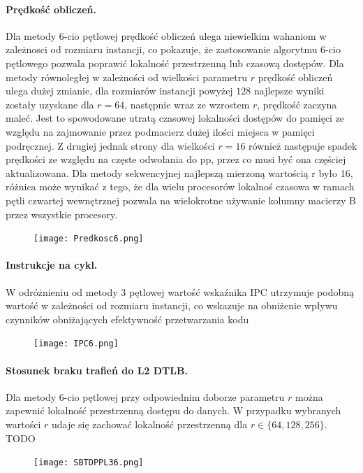 \documentclass{scrartcl}
\begin{document}
\paragraph{Prędkość obliczeń.} Dla metody 6-cio pętlowej prędkość obliczeń ulega niewielkim wahaniom w zależnosci od rozmiaru instancji, co pokazuje, że zastosowanie algorytmu 6-cio pętlowego pozwala poprawić lokalność przestrzenną lub czasową dostępów. Dla metody równoległej w zależności od wielkości parametru $r$ prędkość obliczeń ulega dużej zmianie, dla rozmiarów instancji powyżej $128$ najlepsze wyniki zostały uzyskane dla $r = 64$, następnie wraz ze wzrostem $r$, prędkość zaczyna maleć. Jest to spowodowane utratą czasowej lokalności dostępów do pamięci ze względu na zajmowanie przez podmacierz dużej ilości miejsca w pamięci podręcznej. Z drugiej jednak strony dla wielkości $r = 16$ również następuje spadek prędkości ze względu na częste odwołania do pp, przez co musi być ona częściej aktualizowana. Dla metody sekwencyjnej najlepszą mierzoną wartością r było 16, różnica może wynikać z tego, że dla wielu procesorów lokalnoś czasowa w ramach pętli czwartej wewnętrznej pozwala na wielokrotne używanie kolumny macierzy B przez wszystkie procesory.
\begin{figure}[H]
\texttt{[image: Predkosc6.png]}\\
\end{figure}

\paragraph{Instrukcje na cykl.} W odróżnieniu od metody 3 pętlowej wartość wskaźnika IPC utrzymuje podobną wartość w zależności od rozmiaru instancji, co wskazuje na obniżenie wpływu czynników obniżających efektywność przetwarzania kodu
\begin{figure}[H]
\texttt{[image: IPC6.png]}\\
\end{figure}

\paragraph{Stosunek braku trafień do L2 DTLB.} Dla metody 6-cio pętlowej przy odpowiednim doborze parametru $r$ można zapewnić lokalność przestrzenną dostępu do danych. W przypadku wybranych wartości $r$ udaje się zachować lokalność przestrzenną dla $r \in \{64, 128, 256\}$. TODO
\begin{figure}[H]
\texttt{[image: SBTDPPL36.png]}\\
\end{figure}
\end{document}
